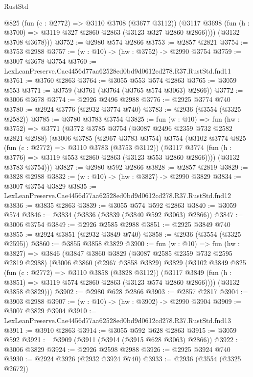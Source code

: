 \begin{lexlean}{RustStd}
\begin{coremodule}
          @825
          (fun (c : @2772) => @3110 @3708 (@3677 @3112))
          (@3117 @3698 (fun (h : @3700) => @3119 @327 @2860 @2863 (@3123 @327 @2860 @2866))))
        (@3132 @3708 @3678)))
@3752 := @2980 @574 @2866
@3753 := @2857 @2821
@3754 := @3753 @2988
@3757 := (w : @10) -> (hw : @3752) -> @2990 @3754
@3759 := @3007 @3678 @3754
@3760 := LexLeanPreserve.Cae4456d77aa62528ed0bd9d0612cd278.R37.RustStd.fnd11
@3761 := @3760 @2863
@3764 := @3055 @553 @574 @2863
@3765 := @3059 @553
@3771 := @3759 (@3761 (@3764 (@3765 @574 @3063) @2866))
@3772 := @3006 @3678
@3774 := @2926 @2496 @2988
@3776 := @2925 @3774 @740
@3780 := @2924 @3776 (@2932 @3774 @740)
@3783 := @2936 (@3554 (@3325 @2582))
@3785 := @3780 @3783 @3754
@3825 := fun (w : @10) =>
  fun (hw : @3752) =>
  @3771
    (@3772
      @3785
      @3754
      (@3087 @2496 @2359 @732 @2582 @2821 @2988)
      (@3006
        @3785
        (@2967 @3783 @3754)
        @3754
        (@3102
          @3774
          @825
          (fun (c : @2772) => @3110 @3783 (@3753 @3112))
          (@3117 @3774 (fun (h : @3776) => @3119 @553 @2860 @2863 (@3123 @553 @2860 @2866))))
        (@3132 @3783 @3754)))
@3827 := @2980 @592 @2866
@3828 := @2857 @2819
@3829 := @3828 @2988
@3832 := (w : @10) -> (hw : @3827) -> @2990 @3829
@3834 := @3007 @3754 @3829
@3835 := LexLeanPreserve.Cae4456d77aa62528ed0bd9d0612cd278.R37.RustStd.fnd12
@3836 := @3835 @2863
@3839 := @3055 @574 @592 @2863
@3840 := @3059 @574
@3846 := @3834 (@3836 (@3839 (@3840 @592 @3063) @2866))
@3847 := @3006 @3754
@3849 := @2926 @2585 @2988
@3851 := @2925 @3849 @740
@3855 := @2924 @3851 (@2932 @3849 @740)
@3858 := @2936 (@3554 (@3325 @2595))
@3860 := @3855 @3858 @3829
@3900 := fun (w : @10) =>
  fun (hw : @3827) =>
  @3846
    (@3847
      @3860
      @3829
      (@3087 @2585 @2359 @732 @2595 @2819 @2988)
      (@3006
        @3860
        (@2967 @3858 @3829)
        @3829
        (@3102
          @3849
          @825
          (fun (c : @2772) => @3110 @3858 (@3828 @3112))
          (@3117 @3849 (fun (h : @3851) => @3119 @574 @2860 @2863 (@3123 @574 @2860 @2866))))
        (@3132 @3858 @3829)))
@3902 := @2980 @628 @2866
@3903 := @2857 @2817
@3904 := @3903 @2988
@3907 := (w : @10) -> (hw : @3902) -> @2990 @3904
@3909 := @3007 @3829 @3904
@3910 := LexLeanPreserve.Cae4456d77aa62528ed0bd9d0612cd278.R37.RustStd.fnd13
@3911 := @3910 @2863
@3914 := @3055 @592 @628 @2863
@3915 := @3059 @592
@3921 := @3909 (@3911 (@3914 (@3915 @628 @3063) @2866))
@3922 := @3006 @3829
@3924 := @2926 @2598 @2988
@3926 := @2925 @3924 @740
@3930 := @2924 @3926 (@2932 @3924 @740)
@3933 := @2936 (@3554 (@3325 @2672))

\end{coremodule}
\end{lexlean}
